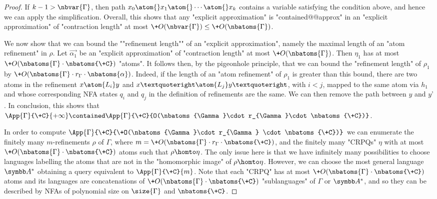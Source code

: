 \begin{proof}
	If $k-1>\nbvar{\Gamma}$, then path $x_0 \atom{} x_1 \atom{} \cdots \atom{} x_k$ contains a variable satisfying the condition above, and hence we can apply the simplification. Overall, this shows that any "explicit approximation" is "contained@@approx"
	in an "explicit approximation" of "contraction length" at most
	$\+O(\nbvar{\Gamma})\leq \+O(\nbatoms{\Gamma})$.

	We now show that we can bound the \AP""refinement length"" of an "explicit approximation",
	namely the maximal length of an "atom refinement" in $\rho$.
	Let $\vec{\alpha_1}$ be an "explicit approximation" of "contraction length" at most
	$\+O(\nbatoms{\Gamma})$. Then $\eta_1$ has at most $\+O(\nbatoms{\Gamma}\cdot\nbatoms{\+C})$
	"atoms". It follows then, by the pigeonhole principle, that we can bound the
	"refinement length" of $\rho_1$ by $\+O(\nbatoms{\Gamma}\cdot r_{\Gamma}\cdot\nbatoms{\alpha})$. Indeed, if the length of an "atom refinement" of $\rho_1$  is greater than this bound, there are two  atoms in the refinement $x\atom{L_i} y$ and  $x’\atom{L_j} y’$, with $i<j$, mapped to the same atom via $h_1$ and whose corresponding NFA states $q_i$ and $q_j$ in the definition of refinements are the same. We can then remove the path between $y$ and $y’$.
	In conclusion, this shows that $\App{\Gamma}{\+C}{+\infty} \contained \App{\Gamma}{\+C}{O(\nbatoms{\Gamma}\cdot r_{\Gamma}\cdot \nbatoms{\+C})}$.

	In order to compute $\App{\Gamma}{\+C}{\+O(\nbatoms{\Gamma}\cdot r_{\Gamma} \cdot \nbatoms{\+C})}$ we can enumerate the finitely many $m$-refinements $\rho$ of $\Gamma$, where $m=\+O(\nbatoms{\Gamma}\cdot r_{\Gamma} \cdot \nbatoms{\+C})$, and the finitely many "CRPQs"  $\eta$ with at most $\+O(\nbatoms{\Gamma} \cdot \nbatoms{\+C})$ atoms such that $\rho\homto \eta$. The only issue here is that we have infinitely many possibilities to choose languages labelling the atoms that are not in the "homomorphic image" of $\rho \homto \eta$. However, we can  choose the most general language $\A^*$ obtaining a query equivalent to $\App{\Gamma}{\+C}{m}$. 
	Note that each "CRPQ" has at most $\+O(\nbatoms{\Gamma} \cdot \nbatoms{\+C})$ atoms and its languages are concatenations of
	 $\+O(\nbatoms{\Gamma} \cdot \nbatoms{\+C})$ "sublanguages" of $\Gamma$ or $\A^*$, and
	so they can be described by NFAs of polynomial size on $\size{\Gamma}$ and $\nbatoms{\+C}$.
\end{proof}

